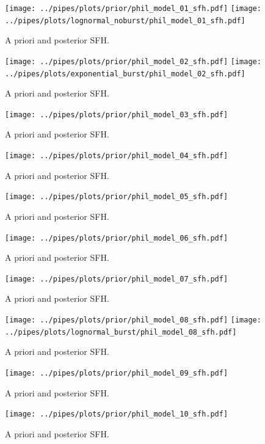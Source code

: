 \documentclass[a4paper,11pt]{article}
\begin{document}
\begin{figure}[h]
\centering
  \texttt{[image: ../pipes/plots/prior/phil\_model\_01\_sfh.pdf]}
  \texttt{[image: ../pipes/plots/lognormal\_noburst/phil\_model\_01\_sfh.pdf]}
  \caption{A priori and posterior SFH.}
  \label{}
\end{figure}

\begin{figure}[h]
  \centering
  \texttt{[image: ../pipes/plots/prior/phil\_model\_02\_sfh.pdf]}
  \texttt{[image: ../pipes/plots/exponential\_burst/phil\_model\_02\_sfh.pdf]}
  \caption{A priori and posterior SFH.}
  \label{}
\end{figure}

\begin{figure}[h]
  \centering
  \texttt{[image: ../pipes/plots/prior/phil\_model\_03\_sfh.pdf]}
  \caption{A priori and posterior SFH.}
  \label{}
\end{figure}

\begin{figure}[h]
  \centering
  \texttt{[image: ../pipes/plots/prior/phil\_model\_04\_sfh.pdf]}
  \caption{A priori and posterior SFH.}
  \label{}
\end{figure}

\begin{figure}[h]
  \centering
  \texttt{[image: ../pipes/plots/prior/phil\_model\_05\_sfh.pdf]}
  \caption{A priori and posterior SFH.}
  \label{}
\end{figure}

\begin{figure}[h]
  \centering
  \texttt{[image: ../pipes/plots/prior/phil\_model\_06\_sfh.pdf]}
  \caption{A priori and posterior SFH.}
  \label{}
\end{figure}

\begin{figure}[h]
  \centering
  \texttt{[image: ../pipes/plots/prior/phil\_model\_07\_sfh.pdf]}
  \caption{A priori and posterior SFH.}
  \label{}
\end{figure}

\begin{figure}[h]
  \centering
  \texttt{[image: ../pipes/plots/prior/phil\_model\_08\_sfh.pdf]}
  \texttt{[image: ../pipes/plots/lognormal\_burst/phil\_model\_08\_sfh.pdf]}
  \caption{A priori and posterior SFH.}
  \label{}
\end{figure}

\begin{figure}[h]
  \centering
  \texttt{[image: ../pipes/plots/prior/phil\_model\_09\_sfh.pdf]}
  \caption{A priori and posterior SFH.}
  \label{}
\end{figure}

\begin{figure}[h]
  \centering
  \texttt{[image: ../pipes/plots/prior/phil\_model\_10\_sfh.pdf]}
  \caption{A priori and posterior SFH.}
  \label{}
\end{figure}
\end{document}
